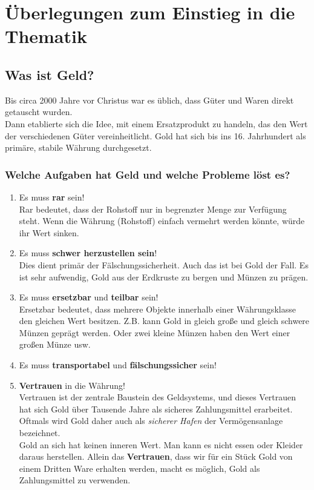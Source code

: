 \documentclass[10pt,a4paper,titlepage]{article}
\begin{document}
\section{Überlegungen zum Einstieg in die Thematik}
\subsection{Was ist Geld?}
Bis circa 2000 Jahre vor Christus war es üblich, dass Güter und Waren direkt getauscht wurden.\\
Dann etablierte sich die Idee, mit einem Ersatzprodukt zu handeln, das den Wert der verschiedenen Güter vereinheitlicht. Gold hat sich bis ins 16. Jahrhundert als primäre, stabile Währung durchgesetzt.
\subsubsection{Welche Aufgaben hat Geld und welche Probleme löst es?}
\begin{enumerate}
\item Es muss \textbf{rar} sein!\\ 
Rar bedeutet, dass der Rohstoff nur in begrenzter Menge zur Verfügung steht. Wenn die Währung (Rohstoff) einfach vermehrt werden könnte, würde ihr Wert sinken.
\item Es muss \textbf{schwer herzustellen sein}!\\
Dies dient primär der Fälschungssicherheit. Auch das ist bei Gold der
Fall. Es ist sehr aufwendig, Gold aus der Erdkruste zu bergen und Münzen zu prägen.
\item Es muss \textbf{ersetzbar} und \textbf{teilbar} sein!\\
Ersetzbar bedeutet, dass mehrere Objekte innerhalb einer Währungsklasse den gleichen Wert besitzen. Z.B. kann Gold in gleich große und gleich schwere Münzen geprägt werden. Oder zwei kleine Münzen haben den Wert einer großen Münze usw. 
\item Es muss \textbf{transportabel} und \textbf{fälschungssicher} sein!
\item \textbf{Vertrauen} in die Währung!\\
Vertrauen ist der zentrale Baustein des Geldsystems, und dieses Vertrauen hat sich Gold über Tausende Jahre als sicheres Zahlungsmittel erarbeitet. Oftmals wird Gold daher auch als \textit{sicherer Hafen} der Vermögensanlage bezeichnet.\\
Gold an sich hat keinen inneren Wert. Man kann es nicht essen oder
Kleider daraus herstellen. Allein das \textbf{Vertrauen}, dass wir für ein Stück Gold von einem Dritten Ware erhalten werden, macht es möglich, Gold als Zahlungsmittel zu verwenden. 
\end{enumerate}
\end{document}
